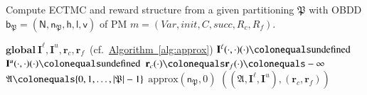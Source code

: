 \documentclass[10pt,twocolumn]{article}
\renewcommand{\gets}{\colonequals}
\newcommand{\frew}{\mathbf{r}_f}
\newcommand{\crew}{\mathbf{r}_c}
\newcommand{\ivall}{{\mathbf{I}^{\ell}}}
\newcommand{\ivalu}{{\mathbf{I}^u}}
\newcommand{\apart}{\mathfrak{P}}
\newcommand{\astates}{\mathfrak{A}}
\newcommand{\bdd}{\mathsf{b}}
\newcommand{\bddNodes}{\mathsf{N}}
\newcommand{\bddNode}{\mathsf{n}}
\newcommand{\bddHi}{\mathsf{h}}
\newcommand{\bddLo}{\mathsf{l}}
\newcommand{\bddNV}{\mathsf{v}}
\newcommand{\prismModel}{m}
\newcommand{\prismVars}{\mathit{Var}}
\newcommand{\prismInit}{\mathit{init}}
\newcommand{\prismSucc}{\mathit{succ}}
\newcommand{\prismCmds}{C}
\newcommand{\prismCRew}{R_c}
\newcommand{\prismFRew}{R_f}
\newcommand{\refalg}[1]{\texorpdfstring{\hyperref[alg:#1]{Algorithm~\ref*{alg:#1}}}{Algorithm~\ref*{alg:#1}}}
\begin{document}
\begin{algorithm}
  \caption{\label{alg:comp-imc}Compute ECTMC and reward structure from a given partitioning 
    $\apart$ with OBDD $\bdd_\apart = (\bddNodes, \bddNode_\apart, \bddHi, \bddLo, \bddNV)$ 
    of PM $\prismModel = (\prismVars, \prismInit, \prismCmds, \prismSucc, \prismCRew, \prismFRew)$.}
  \DontPrintSemicolon
  $\mathbf{global}\ \ivall, \ivalu, \crew, \frew$~(cf.~\refalg{approx}) \;
  $\ivall(\cdot,\cdot)(\cdot) \gets \mathrm{undefined}$ \;
  $\ivalu(\cdot,\cdot)(\cdot) \gets \mathrm{undefined}$ \;
  $\crew(\cdot) \gets \frew(\cdot) \gets -\infty$ \;
  $\astates \gets \{0,1,\ldots,|\apart|-1\}$ \;
  $\mathrm{approx}(\bddNode_\apart, 0)$ \label{lin:call-approx} \;
 \Return $\left((\astates, \ivall, \ivalu), (\crew, \frew)\right)$  \;
\end{algorithm}
\end{document}
